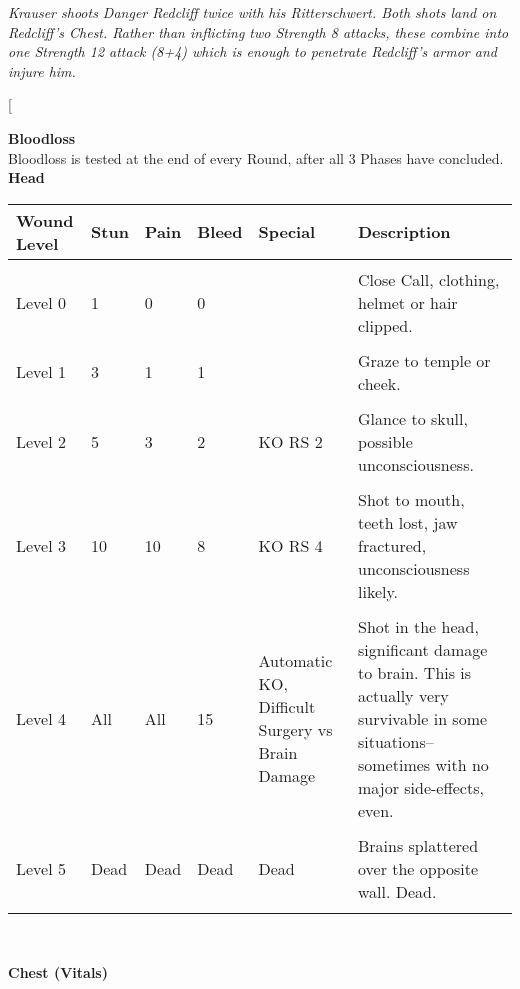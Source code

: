 \documentclass[a4paper, twocolumn, openany]{book}
\begin{document}
{{\itshape Krauser shoots Danger Redcliff twice with his Ritterschwert. Both shots land on Redcliff’s Chest.
Rather than inflicting two Strength 8 attacks, these combine into one Strength 12 attack (8+4)
which is enough to penetrate Redcliff’s armor and injure him.\\}

\twocolumn[{
{\bfseries Bloodloss\\}
Bloodloss is tested at the end of every Round, after all 3 Phases have concluded.\\

{\bfseries Head\\}

{\centering
\begin{tabular}{llllp{3cm}p{7cm}}
Wound Level 	& Stun 	& Pain 	& Bleed 	& Special 											& Description \\ \hline \\
Level 0 		& 1 	& 0 	& 0 		& 													& Close Call, clothing, helmet or hair clipped. \\ \\
Level 1 		& 3 	& 1 	& 1 		& 													& Graze to temple or cheek. \\ \\
Level 2 		& 5 	& 3 	& 2 		& KO RS 2 											& Glance to skull, possible unconsciousness. \\ \\
Level 3 		& 10 	& 10 	& 8 		& KO RS 4 											& Shot to mouth, teeth lost, jaw fractured, unconsciousness likely. \\ \\
Level 4 		& All 	& All 	& 15 		& Automatic KO, Difficult Surgery vs Brain Damage 	& Shot in the head, significant damage to brain. This is actually very survivable in some situations--sometimes with no major side-effects, even.\\ \\
Level 5 					& Dead 			& Dead & Dead & Dead & Brains splattered over the opposite wall. Dead.\\
\\ \hline
\end{tabular}\\[\baselineskip] }

{\bfseries Chest (Vitals)\\}

}}
\end{document}

